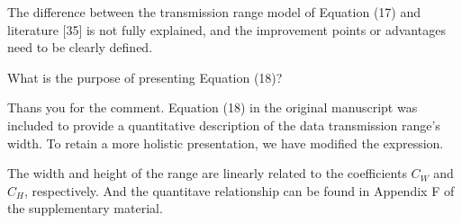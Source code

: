 \begin{revcomment}
	The difference between the transmission range model of Equation (17) and literature [35] is not fully explained, and the improvement points or advantages need to be clearly defined.
\end{revcomment}
\begin{revresponse}
	
\end{revresponse}

\begin{revcomment}
	What is the purpose of presenting Equation (18)?
\end{revcomment}
\begin{revresponse}
	Thans you for the comment.
	Equation (18) in the original manuscript was included to provide a quantitative description of the data transmission range's width.
	To retain a more holistic presentation, we have modified the expression.
	\begin{changes}
		The width and height of the range are linearly related to the coefficients $C_W$ and $C_H$, respectively.
		And the quantitave relationship can be found in Appendix F of the supplementary material.
	\end{changes}
\end{revresponse}

